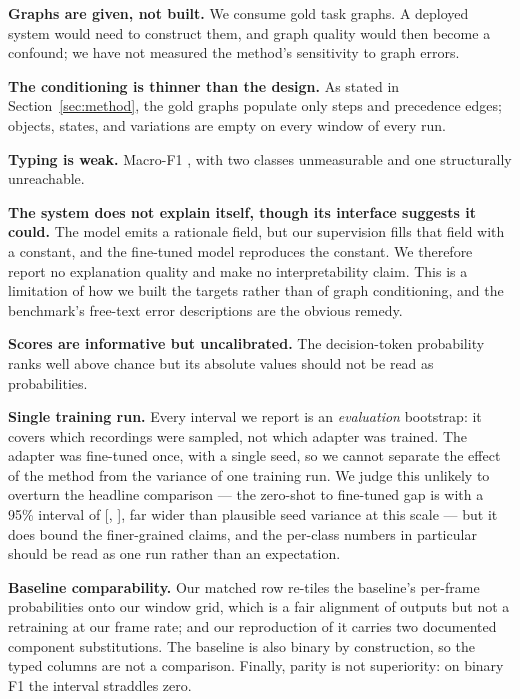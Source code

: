 \documentclass[10pt,twocolumn]{article}
\begin{document}
\textbf{Graphs are given, not built.} We consume gold task graphs. A deployed
system would need to construct them, and graph quality would then become a
confound; we have not measured the method's sensitivity to graph errors.

\textbf{The conditioning is thinner than the design.} As stated in
Section~\ref{sec:method}, the gold graphs populate only steps and precedence
edges; objects, states, and variations are empty on every window of every run.

\textbf{Typing is weak.} Macro-F1 \resMacro{}, with two classes unmeasurable and
one structurally unreachable.

\textbf{The system does not explain itself, though its interface suggests it
could.} The model emits a rationale field, but our supervision fills that field
with a constant, and the fine-tuned model reproduces the constant. We therefore
report no explanation quality and make no interpretability claim. This is a
limitation of how we built the targets rather than of graph conditioning, and
the benchmark's free-text error descriptions are the obvious remedy.

\textbf{Scores are informative but uncalibrated.} The decision-token probability
ranks well above chance but its absolute values should not be read as
probabilities.

\textbf{Single training run.} Every interval we report is an \emph{evaluation}
bootstrap: it covers which recordings were sampled, not which adapter was
trained. The adapter was fine-tuned once, with a single seed, so we cannot
separate the effect of the method from the variance of one training run. We
judge this unlikely to overturn the headline comparison --- the zero-shot to
fine-tuned gap is \resDelta{} with a 95\% interval of [\resDeltaLo{},
\resDeltaHi{}], far wider than plausible seed variance at this scale --- but it
does bound the finer-grained claims, and the per-class numbers in particular
should be read as one run rather than an expectation.

\textbf{Baseline comparability.} Our matched row re-tiles the baseline's
per-frame probabilities onto our window grid, which is a fair alignment of
outputs but not a retraining at our frame rate; and our reproduction of it
carries two documented component substitutions. The baseline is also binary by
construction, so the typed columns are not a comparison. Finally, parity is not
superiority: on binary F1 the interval straddles zero.

\end{document}
